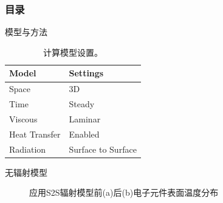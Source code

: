 \documentclass[UTF8,9pt]{ctexbeamer}
\begin{document}
\begin{frame}

\frametitle{目录}

\tableofcontents[currentsection]

\end{frame}

\begin{frame}{模型与方法}
	\begin{table}[]
		\begin{tabular}{l|l}
		\hline
		Model           & Settings           \\ \hline
		Space           & 3D                 \\
		Time            & Steady             \\
		Viscous         & Laminar            \\ 
		Heat   Transfer & Enabled            \\
		Radiation       & Surface to Surface \\
        \hline
		\end{tabular}
		\caption[]{计算模型设置。}
	\end{table}
\end{frame}



\begin{frame}{无辐射模型}
	\begin{figure}[htbp]
		\centering
	   \caption{应用S2S辐射模型前(a)后(b)电子元件表面温度分布}

	   \end{figure}
\end{frame}
\end{document}
